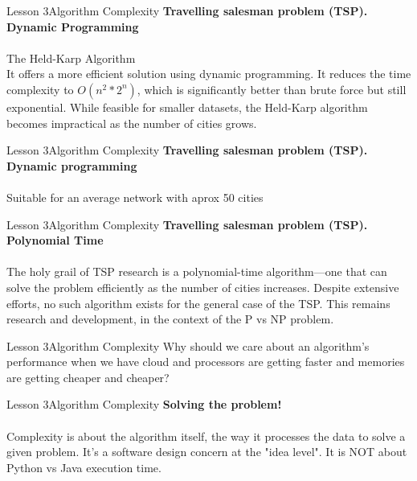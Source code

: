 \documentclass[aspectratio=1610]{beamer}
\begin{document}
\begin{frame}{Lesson 3}{Algorithm Complexity}
\LARGE
\textbf{Travelling salesman problem (TSP). Dynamic Programming}\\~\\
The Held-Karp Algorithm\\
\Large
It offers a more efficient solution using dynamic programming. It reduces 
the time complexity to $O(n^2 * 2^n)$, which is significantly better than 
brute force but still exponential. While feasible for smaller datasets, 
the Held-Karp algorithm becomes impractical as the number of cities grows.
\end{frame}


\begin{frame}{Lesson 3}{Algorithm Complexity}
\LARGE
\textbf{Travelling salesman problem (TSP). Dynamic programming}\\~\\
Suitable for an average network with aprox 50 cities
\end{frame}


\begin{frame}{Lesson 3}{Algorithm Complexity}
\LARGE
\textbf{Travelling salesman problem (TSP). Polynomial Time}\\~\\
The holy grail of TSP research is a polynomial-time algorithm—one that can solve
the problem efficiently as the number of cities increases. Despite extensive
efforts, no such algorithm exists for the general case of the TSP. This remains 
research and development, in the context of the P vs NP problem.
\end{frame}



\begin{frame}{Lesson 3}{Algorithm Complexity}
\huge
Why should we care about an algorithm's performance when we have cloud and
processors are getting faster and memories are getting cheaper and cheaper?
\end{frame}


\begin{frame}{Lesson 3}{Algorithm Complexity}
\LARGE
\textbf{Solving the problem!}\\~\\
Complexity is about the algorithm itself, the way it processes the
data to solve a given problem. It's a software design concern at the
"idea level". It is NOT about Python vs Java execution time.
\end{frame}
\end{document}
